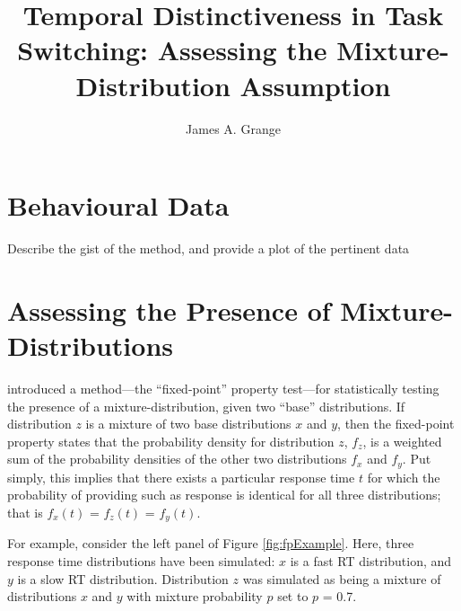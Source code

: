 \documentclass[a4paper, jou, natbib]{apa6}
\title{Temporal Distinctiveness in Task Switching: Assessing the Mixture-Distribution Assumption}
\author{James A. Grange}
\affiliation{School of Psychology, Keele University, UK}
\begin{document}
\maketitle

\section{Behavioural Data}
Describe the gist of the method, and provide a plot of the pertinent data

\section{Assessing the Presence of Mixture-Distributions}
\cite{VanMaanen2014} introduced a method---the ``fixed-point'' property test---for statistically testing the presence of a mixture-distribution, given two ``base'' distributions. If distribution $z$ is a mixture of two base distributions $x$ and $y$, then the fixed-point property states that the probability density for distribution $z$, $f_{z}$, is a weighted sum of the probability densities of the other two distributions $f_{x}$ and $f_{y}$. Put simply, this implies that there exists a particular response time $t$ for which the probability of providing such as response is identical for all three distributions; that is $f_{x}(t)$ = $f_{z}(t)$ = $f_{y}(t)$. 

For example, consider the left panel of Figure \ref{fig:fpExample}. Here, three response time distributions have been simulated: $x$ is a fast RT distribution, and $y$ is a slow RT distribution. Distribution $z$ was simulated as being a mixture of distributions $x$ and $y$ with mixture probability $p$ set to $p$ = 0.7.  
\end{document}
